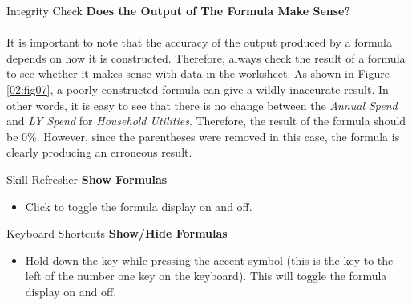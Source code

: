 \begin{center}
	\begin{infobox}{Integrity Check}
		\textbf{Does the Output of The Formula Make Sense?}
		\\
		\\
		It is important to note that the accuracy of the output produced by a formula depends on how it is constructed. Therefore, always check the result of a formula to see whether it makes sense with data in the worksheet. As shown in Figure \ref{02:fig07}, a poorly constructed formula can give a wildly inaccurate result. In other words, it is easy to see that there is no change between the \textit{Annual Spend} and \textit{LY Spend} for \textit{Household Utilities}. Therefore, the result of the formula should be $ 0 $\%. However, since the parentheses were removed in this case, the formula is clearly producing an erroneous result.
	\end{infobox}
\end{center}

\begin{center}
	\begin{sklbox}{Skill Refresher}
		\textbf{Show Formulas}
		\\
		\begin{itemize}
			\setlength{\itemsep}{0pt}
			\setlength{\parskip}{0pt}
			\setlength{\parsep}{0pt}
			
			\item Click  to toggle the formula display on and off.
			
		\end{itemize}
	\end{sklbox}
\end{center}

\begin{center}
	\begin{shtcutbox}{Keyboard Shortcuts}
		\textbf{Show/Hide Formulas}
		\\
		\begin{itemize}
			\setlength{\itemsep}{0pt}
			\setlength{\parskip}{0pt}
			\setlength{\parsep}{0pt}
			
			\item Hold down the  key while pressing the accent symbol  (this is the key to the left of the number one key on the keyboard). This will toggle the formula display on and off.
			
		\end{itemize}
	\end{shtcutbox}
\end{center}

